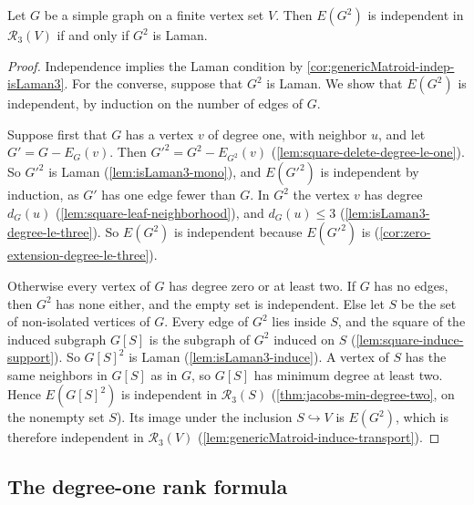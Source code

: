 \begin{theorem}
  \label{thm:jacobs}
  \leanok
  Let $G$ be a simple graph on a finite vertex set $V$. Then $E(G^2)$
  is independent in $\mathcal{R}_3(V)$ if and only if $G^2$ is Laman.
\end{theorem}
\begin{proof}
  \leanok
  Independence implies the Laman condition by
  \cref{cor:genericMatroid-indep-isLaman3}. For the converse, suppose
  that $G^2$ is Laman. We show that $E(G^2)$ is independent, by
  induction on the number of edges of $G$.

  Suppose first that $G$ has a vertex $v$ of degree one, with neighbor
  $u$, and let $G' = G - E_G(v)$. Then $G'^2 = G^2 - E_{G^2}(v)$
  (\cref{lem:square-delete-degree-le-one}). So $G'^2$ is Laman
  (\cref{lem:isLaman3-mono}), and $E(G'^2)$ is independent by
  induction, as $G'$ has one edge fewer than $G$. In $G^2$ the vertex
  $v$ has degree $d_G(u)$ (\cref{lem:square-leaf-neighborhood}), and
  $d_G(u) \le 3$ (\cref{lem:isLaman3-degree-le-three}). So $E(G^2)$ is
  independent because $E(G'^2)$ is
  (\cref{cor:zero-extension-degree-le-three}).

  Otherwise every vertex of $G$ has degree zero or at least two. If $G$
  has no edges, then $G^2$ has none either, and the empty set is
  independent. Else let $S$ be the set of non-isolated vertices of $G$.
  Every edge of $G^2$ lies inside $S$, and the square of the induced
  subgraph $G[S]$ is the subgraph of $G^2$ induced on $S$
  (\cref{lem:square-induce-support}). So $G[S]^2$ is Laman
  (\cref{lem:isLaman3-induce}). A vertex of $S$ has the same neighbors
  in $G[S]$ as in $G$, so $G[S]$ has minimum degree at least two. Hence
  $E(G[S]^2)$ is independent in $\mathcal{R}_3(S)$
  (\cref{thm:jacobs-min-degree-two}, on the nonempty set $S$). Its image
  under the inclusion $S \hookrightarrow V$ is $E(G^2)$, which is
  therefore independent in $\mathcal{R}_3(V)$
  (\cref{lem:genericMatroid-induce-transport}).
\end{proof}

\subsection{The degree-one rank formula}
\label{sec:jacobs-degree-one}

